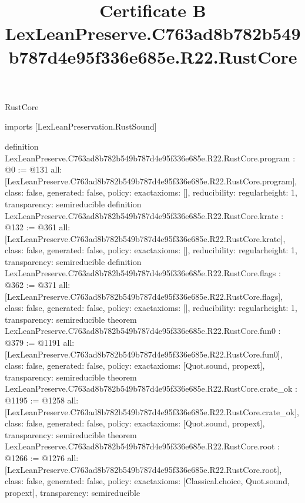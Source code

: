 \begin{lexlean}{RustCore}
\title{Certificate B LexLeanPreserve.C763ad8b782b549b787d4e95f336e685e.R22.RustCore}
\begin{coremodule}
imports [LexLeanPreservation.RustSound]

definition LexLeanPreserve.C763ad8b782b549b787d4e95f336e685e.R22.RustCore.program : @0 := @131 {
  all: [LexLeanPreserve.C763ad8b782b549b787d4e95f336e685e.R22.RustCore.program],
  class: false,
  generated: false,
  policy: exact{axioms: []},
  reducibility: regular{height: 1},
  transparency: semireducible
}
definition LexLeanPreserve.C763ad8b782b549b787d4e95f336e685e.R22.RustCore.krate : @132 := @361 {
  all: [LexLeanPreserve.C763ad8b782b549b787d4e95f336e685e.R22.RustCore.krate],
  class: false,
  generated: false,
  policy: exact{axioms: []},
  reducibility: regular{height: 1},
  transparency: semireducible
}
definition LexLeanPreserve.C763ad8b782b549b787d4e95f336e685e.R22.RustCore.flags : @362 := @371 {
  all: [LexLeanPreserve.C763ad8b782b549b787d4e95f336e685e.R22.RustCore.flags],
  class: false,
  generated: false,
  policy: exact{axioms: []},
  reducibility: regular{height: 1},
  transparency: semireducible
}
theorem LexLeanPreserve.C763ad8b782b549b787d4e95f336e685e.R22.RustCore.fun0 : @379 := @1191 {
  all: [LexLeanPreserve.C763ad8b782b549b787d4e95f336e685e.R22.RustCore.fun0],
  class: false,
  generated: false,
  policy: exact{axioms: [Quot.sound, propext]},
  transparency: semireducible
}
theorem LexLeanPreserve.C763ad8b782b549b787d4e95f336e685e.R22.RustCore.crate_ok : @1195 := @1258 {
  all: [LexLeanPreserve.C763ad8b782b549b787d4e95f336e685e.R22.RustCore.crate_ok],
  class: false,
  generated: false,
  policy: exact{axioms: [Quot.sound, propext]},
  transparency: semireducible
}
theorem LexLeanPreserve.C763ad8b782b549b787d4e95f336e685e.R22.RustCore.root : @1266 := @1276 {
  all: [LexLeanPreserve.C763ad8b782b549b787d4e95f336e685e.R22.RustCore.root],
  class: false,
  generated: false,
  policy: exact{axioms: [Classical.choice, Quot.sound, propext]},
  transparency: semireducible
}


\end{coremodule}
\end{lexlean}
